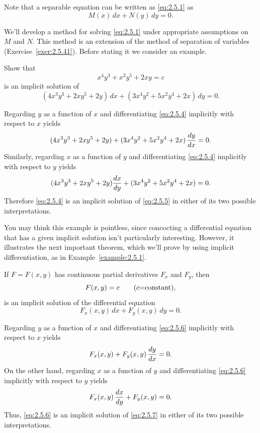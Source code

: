 \documentclass{ximera}
\begin{document}
Note that a separable equation can be written as
\eqref{eq:2.5.1} as
$$
M(x)\,dx+N(y)\,dy=0.
$$


We'll  develop a method for solving \eqref{eq:2.5.1} under appropriate
assumptions on $M$ and $N$. This method is an extension
of the method of separation of variables
(Exercise~\ref{exer:2.5.41}).  Before stating it we
consider an  example.

\begin{example}\label{example:2.5.1} \rm
Show that
\begin{equation} \label{eq:2.5.4}
x^4y^3+x^2y^5+2xy=c
\end{equation}
is an implicit solution of
\begin{equation} \label{eq:2.5.5}
(4x^3y^3+2xy^5+2y)\,dx+(3x^4y^2+5x^2y^4+2x)\,dy=0.
\end{equation}
\end{example}

\solution
Regarding $y$ as a function of $x$ and
differentiating \eqref{eq:2.5.4} implicitly with respect to
$x$ yields
$$
(4x^3y^3+2xy^5+2y)+(3x^4y^2+5x^2y^4+2x)\,{dy\over dx}=0.
$$
Similarly, regarding $x$ as a function of $y$ and
differentiating \eqref{eq:2.5.4} implicitly with respect to
$y$ yields
$$
(4x^3y^3+2xy^5+2y){dx\over dy}+(3x^4y^2+5x^2y^4+2x)=0.
$$
Therefore \eqref{eq:2.5.4} is an implicit solution of \eqref{eq:2.5.5}
in either of its two possible interpretations. \bbox

You may think this example is pointless, since
concocting a differential equation that has a given implicit solution
isn't particularly interesting. However, it illustrates the
next important theorem, which  we'll prove by using implicit
differentiation,  as  in  Example~\ref{example:2.5.1}.

\begin{theorem}\color{blue} \label{thmtype:2.5.1}
If $F=F(x,y)$ has continuous partial derivatives
$F_x$ and $F_y$, then
\begin{equation} \label{eq:2.5.6}
F(x,y)=c\qquad \mbox{{\rm(}$c$=constant\mbox{)}},
\end{equation}
is an implicit solution of the differential equation
\begin{equation} \label{eq:2.5.7}
F_x(x,y)\,dx+F_y(x,y)\,dy=0.
\end{equation}
\end{theorem}

\proof Regarding $y$ as a function of $x$ and  differentiating
\eqref{eq:2.5.6}  implicitly with respect to $x$ yields
$$
F_x(x,y)+F_y(x,y)\,{dy\over dx}=0.
$$
On the other hand,
 regarding $x$ as a function of $y$ and  differentiating
\eqref{eq:2.5.6}  implicitly with respect to $y$ yields
$$
F_x(x,y)\,{dx\over dy}+F_y(x,y)=0.
$$
Thus, \eqref{eq:2.5.6} is an
implicit solution of  \eqref{eq:2.5.7} in either of its two possible
interpretations. \bbox
\end{document}
